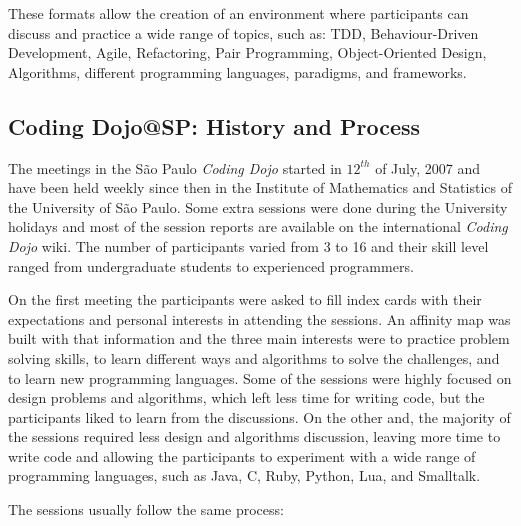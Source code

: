 These formats allow the creation of an environment where participants can discuss and
practice a wide range of topics, such as: TDD, Behaviour-Driven Development, Agile, Refactoring, Pair Programming,
Object-Oriented Design, Algorithms, different programming languages, paradigms, and frameworks.

\subsection{Coding Dojo@SP: History and Process}\label{subsec:dojosp}

The meetings in the São Paulo \emph{Coding Dojo} started in $12^{th}$ of July, 2007 and have been held weekly
since then in the Institute of Mathematics and Statistics of the University of São Paulo. Some extra sessions were
done during the University holidays and most of the session reports are available on the international
\emph{Coding Dojo} wiki\cite{DojoWiki}. The number of participants varied from 3 to 16 and their skill level ranged
from undergraduate students to experienced programmers.

On the first meeting the participants were asked to fill index cards with their expectations and personal
interests in attending the sessions. An affinity map was built with that information and the three main interests
were to practice problem solving skills, to learn different ways and algorithms to solve the challenges, and to
learn new programming languages. Some of the sessions were highly focused on design problems and algorithms, which
left less time for writing code, but the participants liked to learn from the discussions. On the other and, the
majority of the sessions required less design and algorithms discussion, leaving more time to write code and
allowing the participants to experiment with a wide range of programming languages, such as Java, C, Ruby, Python,
Lua, and Smalltalk.

The sessions usually follow the same process:

